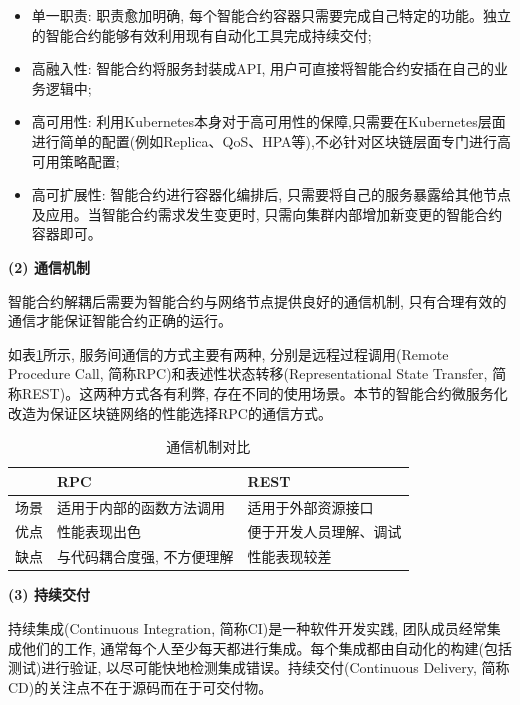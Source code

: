 \begin{itemize}[itemindent=2em]
    \item 单一职责: 职责愈加明确, 每个智能合约容器只需要完成自己特定的功能。独立的智能合约能够有效利用现有自动化工具完成持续交付; 

    \item 高融入性\footnotemark[1]: 智能合约将服务封装成API, 用户可直接将智能合约安插在自己的业务逻辑中;

    \item 高可用性: 利用Kubernetes本身对于高可用性的保障,只需要在Kubernetes层面进行简单的配置(例如Replica、QoS、HPA等),不必针对区块链层面专门进行高可用策略配置;

    \item 高可扩展性: 智能合约进行容器化编排后, 只需要将自己的服务暴露给其他节点及应用。当智能合约需求发生变更时, 只需向集群内部增加新变更的智能合约容器即可。
\end{itemize}


\textbf{(2) 通信机制}

智能合约解耦后需要为智能合约与网络节点提供良好的通信机制, 只有合理有效的通信才能保证智能合约正确的运行。

如表\ref{two_communication}所示, 服务间通信的方式主要有两种, 分别是远程过程调用(Remote Procedure Call, 简称RPC)和表述性状态转移(Representational State Transfer, 简称REST)。这两种方式各有利弊, 存在不同的使用场景。本节的智能合约微服务化改造为保证区块链网络的性能选择RPC的通信方式。

{\footnotesize
\begin{longtable}[h]{m{50pt} m{120pt} m{120pt}}
    \caption[通信机制对比]{通信机制对比} \label{two_communication} \\
        \toprule  
        \textbf{}&\textbf{RPC}&\textbf{REST} \\
        \hline
        场景 & 适用于内部的函数方法调用 & 适用于外部资源接口  \\

        优点 & 性能表现出色 & 便于开发人员理解、调试 \\

        缺点 & 与代码耦合度强, 不方便理解 & 性能表现较差 \\
        \bottomrule
    \end{longtable}
}

\textbf{(3) 持续交付}

持续集成(Continuous Integration, 简称CI)是一种软件开发实践, 团队成员经常集成他们的工作, 通常每个人至少每天都进行集成。每个集成都由自动化的构建(包括测试)进行验证, 以尽可能快地检测集成错误\footnotemark[1]。持续交付(Continuous Delivery, 简称CD)的关注点不在于源码而在于可交付物。

